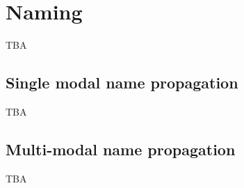 \section{Naming}
\label{sec:naming}

TBA

\subsection{Single modal name propagation}

TBA

\subsection{Multi-modal name propagation}

TBA

\endinput
